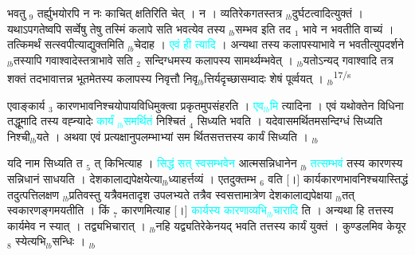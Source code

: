 \documentclass[article,12pt,a4paper]{memoir}%
\newcommand{\quotelemma}[1]{\textcolor{cyan}{#1}}
\newcounter{parCount}
\begin{document}
	  
	  \pstart \leavevmode%
	भवतु {\tiny $_{9}$}\leavevmode{} तर्ह्युभयोरपि न नः काचित् क्षतिरिति चेत् । न । व्यतिरेकगतस्तत्र {\tiny $_{lb}$}दुर्घटत्वादित्युक्तं । यथाऽपगतेष्वपि सर्व्वेषु तेषु तस्मिं कलापे सति भवत्येव तस्य {\tiny $_{lb}$}सम्भव इति तद {\tiny $_{1}$} भावे न भवतीति वाच्यं । तत्किमर्थं सत्स्वपीत्याद्युक्तमिति {\tiny $_{lb}$}चेदाह । \quotelemma{एवं ही \cite[2a4]{vn-msN} त्यादि} । अन्यथा तस्य कलापस्याभावे न भवतीत्युपदर्शने {\tiny $_{lb}$}तस्यापि गवाश्वादेस्तत्राभावे सति {\tiny $_{2}$} सन्दिग्धमस्य कलापस्य सामर्थ्यम्भवेत् । {\tiny $_{lb}$}यतोऽन्यद् गवाश्वादि तत्र शक्तं तदभावात्तन्न भूतमेतस्य कलापस्य निवृत्तौ निवृ{\tiny $_{lb}$}त्तिर्यदृच्छासम्वादः शेषं पूर्व्वयत् ।
	{}
	\pend%
      {\tiny $_{lb}$}\textsuperscript{\textenglish{17/s}}

	  
	  \pstart \leavevmode%
	एवाङ्कार्य {\tiny $_{3}$} कारणभावनिश्चयोपायविधिमुक्त्वा प्रकृतमुपसंहरति । \quotelemma{एव{\tiny $_{lb}$}मि} \cite[2a5]{vn-msN} त्यादिना । एवं यथोक्तेन विधिना तद्धूमादि तस्य वह्न्यादेः \quotelemma{कार्यं {\tiny $_{lb}$}समर्थितं} निश्चितं {\tiny $_{4}$} सिध्यति भवति । यदेवासमर्थितमसन्दिग्धं सिध्यति निश्ची{\tiny $_{lb}$}यते । अथवा एवं प्रत्यक्षानुपलम्भाभ्यां सम र्थितसत्तत्तस्य कार्यं सिध्यति ।
	{}
	\pend%
      {\tiny $_{lb}$}

	  
	  \pstart \leavevmode%
	यदि नाम सिध्यति त {\tiny $_{5}$} त् किभित्याह । \quotelemma{सिद्धं सत् स्वसम्भवेन} आत्मसन्निधानेन {\tiny $_{lb}$} \quotelemma{तत्सम्भवं} तस्य कारणस्य सन्निधानं साधयति \cite[2a6]{vn-msN} । देशकालाद्यपेक्षयेत्या{\tiny $_{lb}$}ध्याहर्त्तव्यं । एतदुक्तम्भ {\tiny $_{6}$} वति [।] कार्यकारणभावनिश्चयास्तिद्धं तदुत्पत्तिलक्षण {\tiny $_{lb}$}प्रतिवस्तु यत्रैवमतादृश उपलभ्यते तत्रैव स्वसत्तामात्रेण देशकालाद्यपेक्षया {\tiny $_{lb}$}तत् स्वकारणङ्गमयतीति । किं {\tiny $_{7}$} कारणमित्याह [।] \quotelemma{कार्यस्य कारणाव्यभि{\tiny $_{lb}$}चारादि} \cite[2a6]{vn-msN} ति । अन्यथा हि तत्तस्य कार्यमेव न स्यात् । तद्व्यभिचारात् । {\tiny $_{lb}$}नहि यद्व्यतिरेकेनयद् भवति तत्तस्य कार्यं युक्तं । कुण्डलमिव केयूर {\tiny $_{8}$} स्येत्यभि{\tiny $_{lb}$}सन्धिः ।
	{}
	\pend%
      {\tiny $_{lb}$}
\end{document}
